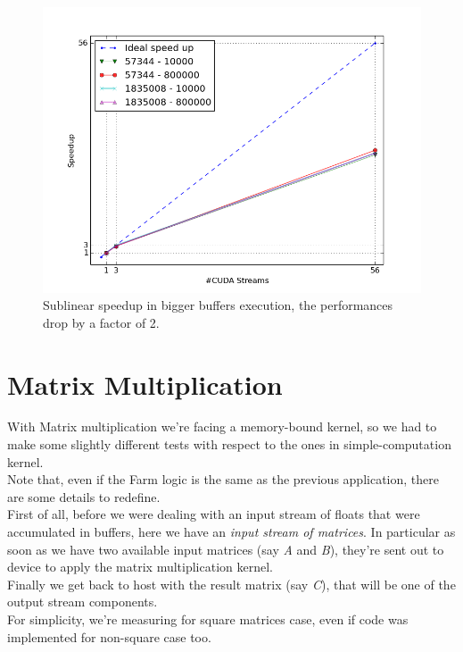 	\begin{figure}
		\vspace{-2cm}
		\centering
		\includegraphics[scale=0.52]{plots/cos_speedup_biggerbuffer.png}
		\caption{Sublinear speedup in bigger buffers execution, the performances drop by a factor of 2.}
		\label{fig:biggerbufferspeedup}
		
	\end{figure}








\section{Matrix Multiplication}
With Matrix multiplication we're facing a memory-bound kernel, so we had to make some slightly different tests with respect to the ones in simple-computation kernel.\\
Note that, even if the Farm logic is the same as the previous application, there are some details to redefine.\\
First of all, before we were dealing with an input stream of floats that were accumulated in buffers, here we have an \textit{input stream of matrices}. In particular as soon as we have two available input matrices (say \textit{A} and \textit{B}), they're sent out to device to apply the matrix multiplication kernel.\\
Finally we get back to host with the result matrix (say \textit{C}), that will be one of the output stream components.\\
For simplicity, we're measuring for square matrices case, even if code was implemented for non-square case too. 


